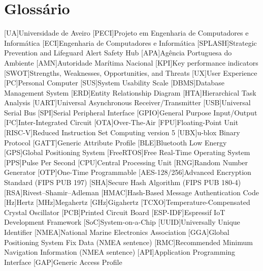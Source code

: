 \chapter{Glossário}

\footnotesize
\SingleSpacing

\begin{multicols}{2}
\begin{acronym}[AAAAAA]


    [UA]{Universidade de Aveiro}
    [PECI]{Projeto em Engenharia de Computadores e Informática}
    [ECI]{Engenharia de Computadores e Informática}
    [SPLASH]{Strategic Prevention and Lifeguard Alert Safety Hub}
    [APA]{Agência Portuguesa do Ambiente}
    [AMN]{Autoridade Marítima Nacional}
    [KPI]{Key performance indicators}
    [SWOT]{Strengths, Weaknesses, Opportunities, and Threats}
    [UX]{User Experience}
    [PC]{Personal Computer}
    [SUS]{System Usability Scale}
    [DBMS]{Database Management System}
    [ERD]{Entity Relationship Diagram}
    [HTA]{Hierarchical Task Analysis}
    [UART]{Universal Asynchronous Receiver/Transmitter}
    [USB]{Universal Serial Bus}
    [SPI]{Serial Peripheral Interface}
    [GPIO]{General Purpose Input/Output}
    [I²C]{Inter-Integrated Circuit}
    [OTA]{Over-The-Air}
    [FPU]{Floating-Point Unit}
    [RISC-V]{Reduced Instruction Set Computing version 5}
    [UBX]{u-blox Binary Protocol}
    [GATT]{Generic Attribute Profile}
    [BLE]{Bluetooth Low Energy}
    [GPS]{Global Positioning System}
    [FreeRTOS]{Free Real-Time Operating System}
    [PPS]{Pulse Per Second}
    [CPU]{Central Processing Unit}
    [RNG]{Random Number Generator}
    [OTP]{One-Time Programmable}
    [AES-128/256]{Advanced Encryption Standard (FIPS PUB 197)}
    [SHA]{Secure Hash Algorithm (FIPS PUB 180-4)}
    [RSA]{Rivest–Shamir–Adleman}
    [HMAC]{Hash-Based Message Authentication Code}
    [Hz]{Hertz}
    [MHz]{Megahertz}
    [GHz]{Gigahertz}
    [TCXO]{Temperature-Compensated Crystal Oscillator}
    [PCB]{Printed Circuit Board}
    [ESP-IDF]{Espressif IoT Development Framework}
    [SoC]{System-on-a-Chip}
    [UUID]{Universally Unique Identifier}
    [NMEA]{National Marine Electronics Association}
    [GGA]{Global Positioning System Fix Data (NMEA sentence)}
    [RMC]{Recommended Minimum Navigation Information (NMEA sentence)}
    [API]{Application Programming Interface}
    [GAP]{Generic Access Profile}


    

\end{acronym}
\end{multicols}

